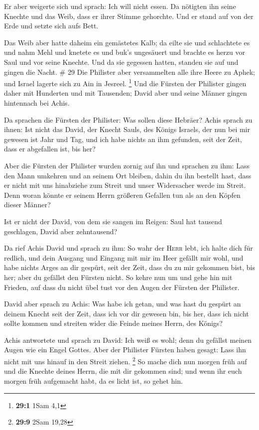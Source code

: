  Er aber weigerte sich und sprach: Ich will nicht essen.
Da nötigten ihn seine Knechte und das Weib, dass er ihrer Stimme
gehorchte. Und er stand auf von der Erde und setzte sich aufs Bett.

 Das Weib aber hatte daheim ein gemästetes Kalb; da eilte
sie und schlachtete es und nahm Mehl und knetete es und buk's ungesäuert
 und brachte es herzu vor Saul und vor seine Knechte. Und
da sie gegessen hatten, standen sie auf und gingen die Nacht. \# 29
 Die Philister aber versammelten alle ihre Heere zu Aphek;
und Israel lagerte sich zu Ain in Jesreel. \footnote{\textbf{29:1} 1Sam
  4,1}  Und die Fürsten der Philister gingen daher mit
Hunderten und mit Tausenden; David aber und seine Männer gingen
hintennach bei Achis.

 Da sprachen die Fürsten der Philister: Was sollen diese
Hebräer? Achis sprach zu ihnen: Ist nicht das David, der Knecht Sauls,
des Königs Israels, der nun bei mir gewesen ist Jahr und Tag, und ich
habe nichts an ihm gefunden, seit der Zeit, dass er abgefallen ist, bis
her?

 Aber die Fürsten der Philister wurden zornig auf ihn und
sprachen zu ihm: Lass den Mann umkehren und an seinem Ort bleiben, dahin
du ihn bestellt hast, dass er nicht mit uns hinabziehe zum Streit und
unser Widersacher werde im Streit. Denn woran könnte er seinem Herrn
größeren Gefallen tun als an den Köpfen dieser Männer?

 Ist er nicht der David, von dem sie sangen im Reigen:
Saul hat tausend geschlagen, David aber zehntausend?

 Da rief Achis David und sprach zu ihm: So wahr der
\textsc{Herr} lebt, ich halte dich für redlich, und dein Ausgang und
Eingang mit mir im Heer gefällt mir wohl, und habe nichts Arges an dir
gespürt, seit der Zeit, dass du zu mir gekommen bist, bis her; aber du
gefällst den Fürsten nicht.  So kehre nun um und gehe hin
mit Frieden, auf dass du nicht übel tust vor den Augen der Fürsten der
Philister.

 David aber sprach zu Achis: Was habe ich getan, und was
hast du gespürt an deinem Knecht seit der Zeit, dass ich vor dir gewesen
bin, bis her, dass ich nicht sollte kommen und streiten wider die Feinde
meines Herrn, des Königs?

 Achis antwortete und sprach zu David: Ich weiß es wohl;
denn du gefällst meinen Augen wie ein Engel Gottes. Aber der Philister
Fürsten haben gesagt: Lass ihn nicht mit uns hinauf in den Streit
ziehen. \footnote{\textbf{29:9} 2Sam 19,28}  So mache
dich nun morgen früh auf und die Knechte deines Herrn, die mit dir
gekommen sind; und wenn ihr euch morgen früh aufgemacht habt, da es
licht ist, so gehet hin.


